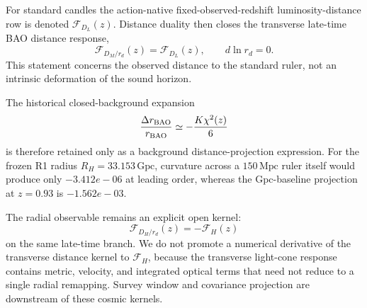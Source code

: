 For standard candles the action-native fixed-observed-redshift luminosity-distance
row is denoted $\mathcal F_{D_L}(z)$. Distance duality then closes the
transverse late-time BAO distance response,
\[
\boxed{\mathcal F_{D_M/r_d}(z)=\mathcal F_{D_L}(z)},
\qquad d\ln r_d=0.
\]
This statement concerns the observed distance to the standard ruler, not an
intrinsic deformation of the sound horizon.

The historical closed-background expansion
\[
\frac{\Delta r_{\rm BAO}}{r_{\rm BAO}}
\simeq -\frac{K\chi^2(z)}{6}
\]
is therefore retained only as a background distance-projection expression. For
the frozen R1 radius $R_H=33.153\,\mathrm{Gpc}$, curvature across a
$150\,\mathrm{Mpc}$ ruler itself would produce only
$-3.412e-06$ at leading order, whereas the Gpc-baseline projection
at $z=0.93$ is $-1.562e-03$.

The radial observable remains an explicit open kernel:
\[
\mathcal F_{D_H/r_d}(z)=-\mathcal F_H(z)
\]
on the same late-time branch. We do not promote a numerical derivative of the
transverse distance kernel to $\mathcal F_H$, because the transverse light-cone
response contains metric, velocity, and integrated optical terms that need not
reduce to a single radial remapping. Survey window and covariance projection
are downstream of these cosmic kernels.
